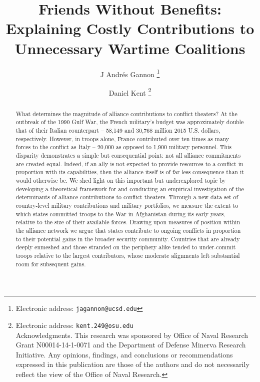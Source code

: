 \documentclass[12pt,letterpaper]{article}
\title{Friends Without Benefits: Explaining Costly Contributions to Unnecessary Wartime Coalitions}
\author{J Andr\'{e}s Gannon%
	\thanks{Electronic address: \texttt{jagannon@ucsd.edu}}}
\affil{Department of Political Science \\ University of California, San Diego}
\author{Daniel Kent%
	\thanks{Electronic address: \texttt{kent.249@osu.edu} \\ Acknowledgments. This research was sponsored by Office of Naval Research Grant N00014-14-1-0071 and the Department of Defense Minerva Research Initiative. Any opinions, findings, and conclusions or recommendations expressed in this publication are those of the authors and do not necessarily reflect the view of the Office of Naval Research.}}
\affil{Department of Political Science \\ The Ohio State University}
\begin{document}
\maketitle

\begin{abstract}
What determines the magnitude of alliance contributions to conflict theaters? At the outbreak of the 1990 Gulf War, the French military's budget was approximately double that of their Italian counterpart -- 58,149 and 30,768 million 2015 U.S. dollars, respectively. However, in troops alone, France contributed over ten times as many forces to the conflict as Italy -- 20,000 as opposed to 1,900 military personnel. This disparity demonstrates a simple but consequential point: not all alliance commitments are created equal. Indeed, if an ally is not expected to provide resources to a conflict in proportion with its capabilities, then the alliance itself is of far less consequence than it would otherwise be.
We shed light on this important but underexplored topic by developing a theoretical framework for and conducting an empirical investigation of the determinants of alliance contributions to conflict theaters. Through a new data set of country-level military contributions and military portfolios, we measure the extent to which states committed troops to the War in Afghanistan during its early years, relative to the size of their available forces. Drawing upon measures of position within the alliance network we argue that states contribute to ongoing conflicts in proportion to their potential gains in the broader security community. Countries that are already deeply enmeshed and those stranded on the periphery alike tended to under-commit troops relative to the largest contributors, whose moderate alignments left substantial room for subsequent gains.

\end{abstract}
\end{document}

